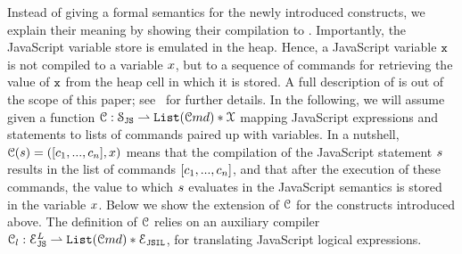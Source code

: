 Instead of giving a formal semantics for the newly introduced constructs, we explain 
their meaning by showing their compilation to \jsil. 
Importantly, the JavaScript variable store is emulated in the heap. 
Hence, a JavaScript variable $\mathtt{x}$ is not compiled to a \jsil variable $x$, but to a sequence  
of \jsil commands for retrieving the value of $\mathtt{x}$ from the heap cell in which it is stored. 
A full description of \JSComp is out of the scope of this paper; see~\cite{Daiva2017}
for further details.
%
In the following, we will assume given a function ${\mathcal C} : \mathcal{S}_{\mathtt{JS}} \rightharpoonup \mathtt{List}(\mathcal{C}md) * \mathcal{X}$ mapping JavaScript expressions 
and statements to lists of \jsil commands paired up with \jsil variables. 
In a nutshell, ${\mathcal C}(s) = ([ c_1, ..., c_n], x)$ means that the compilation 
of the JavaScript statement $s$ results in the list of \jsil commands $[ c_1, ..., c_n]$, 
and that after the execution of these commands, the value to which $s$ evaluates in the 
JavaScript semantics is stored in the \jsil variable $x$. 
%
Below we show the extension of ${\mathcal C}$ for the constructs introduced above. 
The definition of ${\mathcal C}$ relies on an auxiliary compiler ${\mathcal C}_l : \mathcal{E}_{\mathtt{JS}}^L \rightharpoonup \mathtt{List}(\mathcal{C}md) * \mathcal{E}_{\mathtt{JSIL}}$, 
for translating JavaScript logical expressions.

